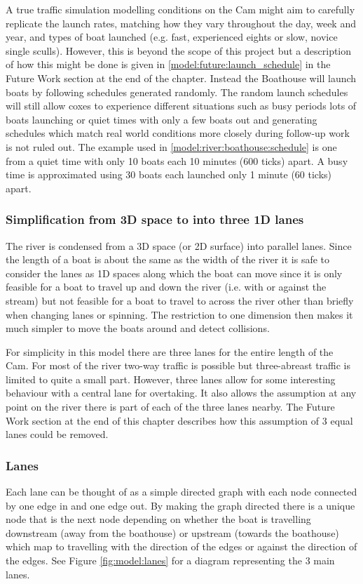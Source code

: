       A true traffic simulation modelling conditions on the Cam might aim to carefully replicate the launch rates, matching how they vary throughout the day, week and year, and types of boat launched (e.g. fast, experienced eights or slow, novice single sculls). However, this is beyond the scope of this project but a description of how this might be done is given in \ref{model:future:launch_schedule} in the Future Work section at the end of the chapter. Instead the Boathouse will launch boats by following schedules generated randomly. The random launch schedules will still allow coxes to experience different situations such as busy periods lots of boats launching or quiet times with only a few boats out and generating schedules which match real world conditions more closely during follow-up work is not ruled out. The example used in \ref{model:river:boathouse:schedule} is one from a quiet time with only 10 boats each 10 minutes (600 ticks) apart. A busy time is approximated using 30 boats each launched only 1 minute (60 ticks) apart.
      
      \subsubsection{Simplification from 3D space to into three 1D lanes}
      The river is condensed from a 3D space (or 2D surface) into parallel lanes. Since the length of a boat is about the same as the width of the river it is safe to consider the lanes as 1D spaces along which the boat can move since it is only feasible for a boat to travel up and down the river (i.e. with or against the stream) but not feasible for a boat to travel to across the river other than briefly when changing lanes or spinning. The restriction to one dimension then makes it much simpler to move the boats around and detect collisions.
      
      For simplicity in this model there are three lanes for the entire length of the Cam. For most of the river two-way traffic is possible but three-abreast traffic is limited to quite a small part. However, three lanes allow for some interesting behaviour with a central lane for overtaking. It also allows the assumption at any point on the river there is part of each of the three lanes nearby. The Future Work section at the end of this chapter describes how this assumption of 3 equal lanes could be removed.
      
      \subsubsection{Lanes}\label{model:river:lanes}
      Each lane can be thought of as a simple directed graph with each node connected by one edge in and one edge out. By making the graph directed there is a unique node that is the next node depending on whether the boat is travelling downstream (away from the boathouse) or upstream (towards the boathouse) which map to travelling with the direction of the edges or against the direction of the edges. See Figure \ref{fig:model:lanes} for a diagram representing the 3 main lanes.
      
